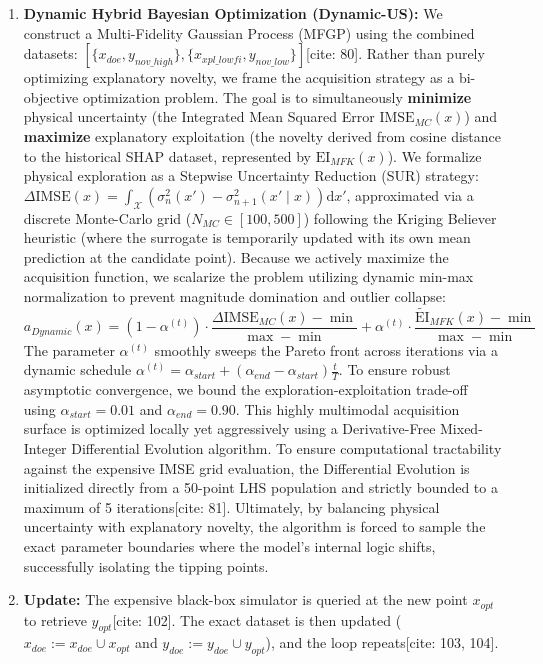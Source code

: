\documentclass[sn-mathphys]{sn-jnl}
\theoremstyle{thmstyleone}%
\theoremstyle{thmstyletwo}%
\theoremstyle{thmstylethree}%
\begin{document}
\begin{enumerate}
    \item \textbf{Dynamic Hybrid Bayesian Optimization (Dynamic-US):} We construct a Multi-Fidelity Gaussian Process (MFGP) using the combined datasets: $[\{x_{doe}, y_{nov\_high}\}, \{x_{xpl\_lowfi}, y_{nov\_low}\}]$[cite: 80]. Rather than purely optimizing explanatory novelty, we frame the acquisition strategy as a bi-objective optimization problem. The goal is to simultaneously \textbf{minimize} physical uncertainty (the Integrated Mean Squared Error $\text{IMSE}_{MC}(x)$) and \textbf{maximize} explanatory exploitation (the novelty derived from cosine distance to the historical SHAP dataset, represented by $\text{EI}_{MFK}(x)$). We formalize physical exploration as a Stepwise Uncertainty Reduction (SUR) strategy: $\Delta\text{IMSE}(x) = \int_{\mathcal{X}} \left( \sigma^2_n(x') - \sigma^2_{n+1}(x' \mid x) \right) \text{d}x'$, approximated via a discrete Monte-Carlo grid ($N_{MC} \in [100, 500]$) following the Kriging Believer heuristic (where the surrogate is temporarily updated with its own mean prediction at the candidate point). Because we actively maximize the acquisition function, we scalarize the problem utilizing dynamic min-max normalization to prevent magnitude domination and outlier collapse:
    \begin{equation}
        a_{Dynamic}(x) = (1 - \alpha^{(t)}) \cdot \frac{\Delta\text{IMSE}_{MC}(x) - \min}{\max - \min} + \alpha^{(t)} \cdot \frac{\widetilde{\text{EI}}_{MFK}(x) - \min}{\max - \min}
    \end{equation}
    The parameter $\alpha^{(t)}$ smoothly sweeps the Pareto front across iterations via a dynamic schedule $\alpha^{(t)} = \alpha_{start} + (\alpha_{end} - \alpha_{start}) \frac{t}{T}$. To ensure robust asymptotic convergence, we bound the exploration-exploitation trade-off using $\alpha_{start} = 0.01$ and $\alpha_{end} = 0.90$. This highly multimodal acquisition surface is optimized locally yet aggressively using a Derivative-Free Mixed-Integer Differential Evolution algorithm. To ensure computational tractability against the expensive IMSE grid evaluation, the Differential Evolution is initialized directly from a 50-point LHS population and strictly bounded to a maximum of 5 iterations[cite: 81]. Ultimately, by balancing physical uncertainty with explanatory novelty, the algorithm is forced to sample the exact parameter boundaries where the model's internal logic shifts, successfully isolating the tipping points.
    
    \item \textbf{Update:} The expensive black-box simulator is queried at the new point $x_{opt}$ to retrieve $y_{opt}$[cite: 102]. The exact dataset is then updated ($x_{doe} := x_{doe} \cup x_{opt}$ and $y_{doe} := y_{doe} \cup y_{opt}$), and the loop repeats[cite: 103, 104].
\end{enumerate}
\end{document}
